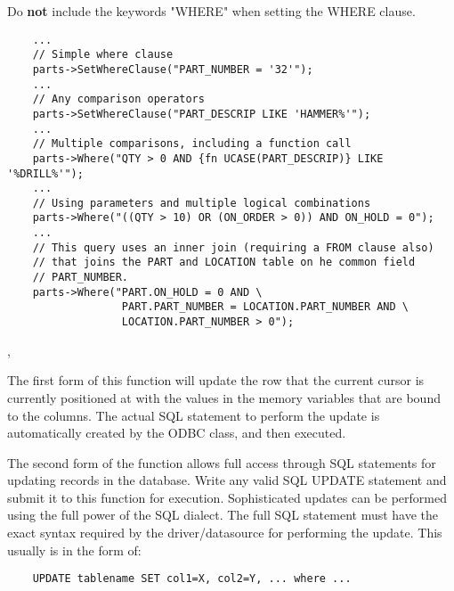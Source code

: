 Do {\bf not} include the keywords "WHERE" when setting the WHERE clause.


\begin{verbatim}
    ...
    // Simple where clause
    parts->SetWhereClause("PART_NUMBER = '32'");
    ...
    // Any comparison operators
    parts->SetWhereClause("PART_DESCRIP LIKE 'HAMMER%'");
    ...
    // Multiple comparisons, including a function call
    parts->Where("QTY > 0 AND {fn UCASE(PART_DESCRIP)} LIKE '%DRILL%'");
    ...
    // Using parameters and multiple logical combinations
    parts->Where("((QTY > 10) OR (ON_ORDER > 0)) AND ON_HOLD = 0");
    ...
    // This query uses an inner join (requiring a FROM clause also)
    // that joins the PART and LOCATION table on he common field
    // PART_NUMBER.
    parts->Where("PART.ON_HOLD = 0 AND \
                  PART.PART_NUMBER = LOCATION.PART_NUMBER AND \
                  LOCATION.PART_NUMBER > 0");
\end{verbatim}


,

\label{wxdbtableupdate}



The first form of this function will update the row that the current cursor
is currently positioned at with the values in the memory variables that
are bound to the columns.  The actual SQL statement to perform the update
is automatically created by the ODBC class, and then executed.

The second form of the function allows full access through SQL statements for
updating records in the database.  Write any valid SQL UPDATE statement and
submit it to this function for execution.  Sophisticated updates can be
performed using the full power of the SQL dialect. The full SQL statement
must have  the exact syntax required by the driver/datasource for performing
the update.  This usually is in the form of:

\begin{verbatim}
    UPDATE tablename SET col1=X, col2=Y, ... where ...
\end{verbatim}


